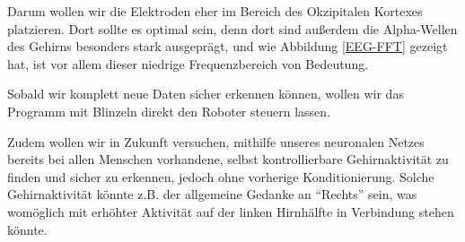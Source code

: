 \documentclass{scrartcl}
\begin{document}
	Darum wollen wir die Elektroden eher im Bereich des Okzipitalen Kortexes platzieren. Dort sollte es optimal sein, denn dort sind außerdem die Alpha-Wellen des Gehirns besonders stark ausgeprägt, und wie Abbildung \ref{EEG-FFT} gezeigt hat, ist vor allem dieser niedrige Frequenzbereich von Bedeutung.






	Sobald wir komplett neue Daten sicher erkennen können, wollen wir das Programm mit Blinzeln direkt den Roboter steuern lassen.

	Zudem wollen wir in Zukunft versuchen, mithilfe unseres neuronalen Netzes bereits bei allen Menschen vorhandene, selbst kontrollierbare Gehirnaktivität zu finden und sicher zu erkennen, jedoch ohne vorherige Konditionierung. Solche Gehirnaktivität könnte z.B. der allgemeine Gedanke an \enquote{Rechts} sein, was womöglich mit erhöhter Aktivität auf der linken Hirnhälfte in Verbindung stehen könnte.
\end{document}
